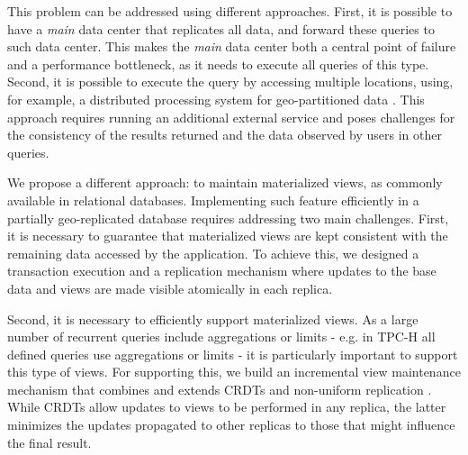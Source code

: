 \documentclass[sigconf, nonacm]{acmart}
\begin{document}
This problem can be addressed using different approaches. 
First, it is possible to have a \emph{main} data center that replicates all data, and forward these queries to such data center.
This makes the \emph{main} data center both a central point of failure and a performance bottleneck, as it needs to execute all queries of this type. 
Second, it is possible to execute the query by accessing multiple locations,  using, for example, 
a distributed processing system for geo-partitioned data \cite{kloudas2015pixida,jetstream}.
This approach requires running an additional external service and poses challenges for the consistency of the results returned and the data observed by users in other queries.

We propose a different approach: to maintain materialized views, as commonly available in relational databases.
Implementing such feature efficiently in a partially geo-replicated database requires 
addressing two main challenges. 
First, it is necessary to guarantee that materialized views are kept consistent with the remaining data
accessed by the application. 
To achieve this, we designed a transaction execution and a replication mechanism where updates 
to the base data and views are made visible atomically in each replica.

Second, it is necessary to efficiently support materialized views. 
As a large number of recurrent queries include aggregations or limits - e.g. in TPC-H \cite{tpch}
all defined queries use aggregations or limits - it is particularly important to support
this type of views.  For supporting this, we build an incremental view maintenance 
mechanism that combines and extends CRDTs \cite{crdt} and non-uniform replication \cite{Cabrita17Nonuniform}.
While CRDTs allow updates to views to be performed in any replica, the latter minimizes
the updates propagated to other replicas to those that might influence the final result.


\end{document}
